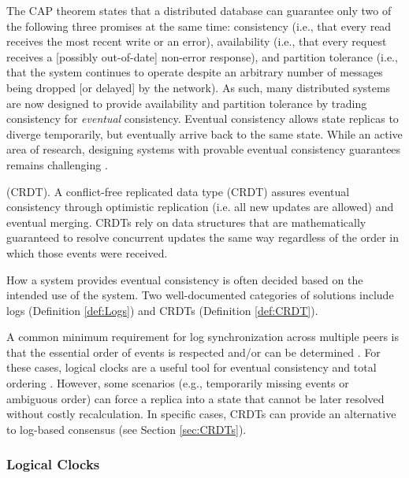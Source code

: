 \documentclass{textile}
\begin{document}
The CAP theorem \cite{brewerRobustDistributedSystems2000,gilbertBrewerConjectureFeasibility2002a} states that a distributed database can guarantee only two of the following three promises at the same time: consistency (i.e., that every read receives the most recent write or an error), availability (i.e., that every request receives a [possibly out-of-date] non-error response), and partition tolerance (i.e., that the system continues to operate despite an arbitrary number of messages being dropped [or delayed] by the network). As such, many distributed systems are now designed to provide availability and partition tolerance by trading consistency for \emph{eventual} consistency. Eventual consistency allows state replicas to diverge temporarily, but eventually arrive back to the same state. While an active area of research, designing systems with provable eventual consistency guarantees remains challenging \cite{shapiroComprehensiveStudyConvergent2011a,almeidaDeltaStateReplicated2018}.

\begin{definition}
  (CRDT). A conflict-free replicated data type (CRDT) assures eventual consistency through optimistic replication (i.e. all new updates are allowed) and eventual merging. CRDTs rely on data structures that are mathematically guaranteed to resolve concurrent updates the same way regardless of the order in which those events were received.
\end{definition} \label{def:CRDT}

How a system provides eventual consistency is often decided based on the intended use of the system. Two well-documented categories of solutions include logs (Definition  \ref{def:Logs}) and CRDTs (Definition  \ref{def:CRDT}).

A common minimum requirement for log synchronization across multiple peers is that the essential order of events is respected and/or can be determined \cite{schwarzDetectingCausalRelationships1994,katzInterleavingSetTemporal1990}. For these cases, logical clocks are a useful tool for eventual consistency and total ordering \cite{kulkarniLogicalPhysicalClocks2014}. However, some scenarios (e.g., temporarily missing events or ambiguous order) can force a replica into a state that cannot be later resolved without costly recalculation. In specific cases, CRDTs can provide an alternative to log-based consensus (see Section \ref{sec:CRDTs}). 

\subsubsection{Logical Clocks}\label{sec:LogicalClocks}
\end{document}
